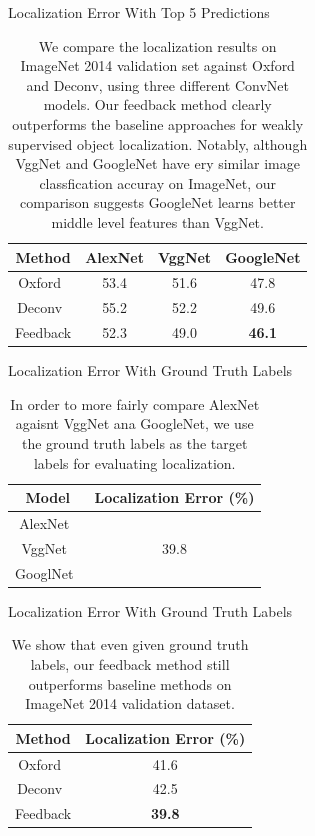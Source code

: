\begin{table}
\centering
Localization Error With Top 5 Predictions
\begin{tabular}{|c|c|c|c|}
\hline
Method & AlexNet & VggNet & GoogleNet \\ 
\hline
Oxford~\cite{simonyan2013deep} & 53.4 & 51.6 & 47.8 \\
Deconv~\cite{zeiler2014visualizing} & 55.2 & 52.2 & 49.6\\
Feedback & 52.3 & 49.0 & \textbf{46.1} \\
\hline
\end{tabular}
\caption{We compare the localization results on ImageNet 2014 validation set against Oxford and Deconv, using three different ConvNet models. Our feedback method clearly outperforms the baseline approaches for weakly supervised object localization. Notably, although VggNet and GoogleNet have ery similar image classfication accuray on ImageNet, our comparison suggests GoogleNet learns better middle level features than VggNet.}
\label{tab:localization_accuracy_top5}
\end{table}

\begin{table}
\centering
Localization Error With Ground Truth Labels
\begin{tabular}{|c|c|}
\hline
Model & Localization Error (\%) \\ 
\hline
AlexNet~\cite{Krizhevsky2012ImageNet} & \\
VggNet~\cite{Simonyan2014Very} & 39.8 \\
GooglNet~\cite{Szegedy2014Going} & \\
\hline
\end{tabular}
\caption{In order to more fairly compare AlexNet agaisnt VggNet ana GoogleNet, we use the ground truth labels as the target labels for evaluating localization.}
\label{tab:localization_model_compare}
\end{table}

\begin{table}
\centering
Localization Error With Ground Truth Labels
\begin{tabular}{|c|c|}
\hline
Method & Localization Error (\%) \\
\hline
Oxford~\cite{simonyan2013deep} & 41.6 \\
Deconv~\cite{zeiler2014visualizing} & 42.5 \\
Feedback & \textbf{39.8} \\
\hline
\end{tabular}
\caption{We show that even given ground truth labels, our feedback method still outperforms baseline methods on ImageNet 2014 validation dataset.}
\label{tab:localization_accuracy}
\end{table}

